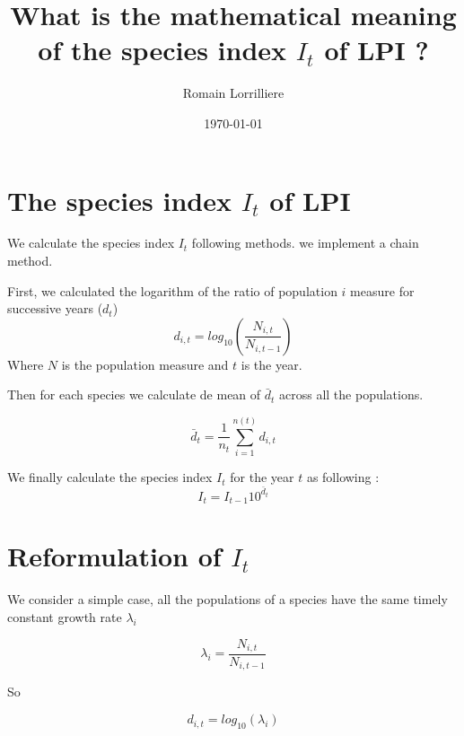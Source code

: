 \documentclass[A4,7pt]{article}
\begin{document}
\title{What is the mathematical meaning of the species index $I_t$ of
  LPI ?} 
\date{\today}
\author{Romain Lorrilliere}

 \maketitle

 \section{The species index $I_t$  of LPI}
We calculate the species index $I_t$ following \cite{loh_living_2005,collen_monitoring_2009} methods. we implement a chain method.

First, we calculated the logarithm of the ratio of population $i$
 measure for successive years ($d_t$)
 \begin{equation}
   \label{eq:dt}
   d_{i,t} = log_{10}\left(\frac{N_{i,t}}{N_{i,t-1}}\right)
 \end{equation}
 Where $N$ is the population measure and $t$ is the year.

 Then for each species we calculate de mean of $\bar{d}_t$ across all
 the populations.

 
 \begin{equation}
   \label{eq:d_bar}
   \bar{d}_t=\frac{1}{n_t}\sum_{i=1}^{n(t)}d_{i,t}
 \end{equation}

We finally calculate the species index $I_t$ for the year $t$ as
following :
\begin{equation}
  \label{eq:I}
  I_t = I_{t-1}10^{\bar{d}_t}
\end{equation}


\section{Reformulation of $I_t$ }

We consider a simple case, all the populations of a species have the
same timely constant growth rate $\lambda_i$ 

\begin{equation}
  \label{eq:lambda}
  \lambda_i = \frac{N_{i,t}}{N_{i,t-1}}
\end{equation}

So 

\begin{equation}
  \label{eq:dt2}
   d_{i,t} = log_{10}\left(\lambda_i\right)
\end{equation}
\end{document}
